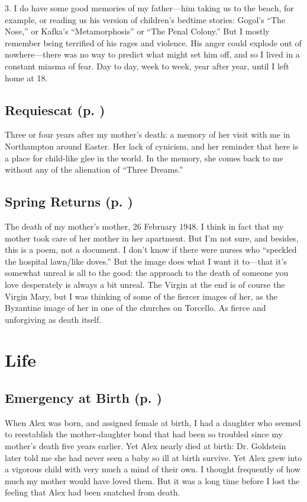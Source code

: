 3. I do have some good memories of my father---him taking us to the beach, for
example, or reading us his version of children's bedtime stories: Gogol's ``The
Nose,'' or Kafka's ``Metamorphosis'' or ``The Penal Colony.'' But I mostly
remember being terrified of his rages and violence. His anger could explode out
of nowhere---there was no way to predict what might set him off, and so I lived
in a constant miasma of fear. Day to day, week to week, year after year, until I
left home at 18.

\subsection{Requiescat (p. \pageref{ch:requiescat})}
Three or four years after my mother's death: a memory of her visit with me in
Northampton around Easter. Her lack of cynicism, and her reminder that here is a
place for child-like glee in the world. In the memory, she comes back to me
without any of the alienation of ``Three Dreams.''

\subsection{Spring Returns (p. \pageref{ch:springreturns})}
The death of my mother's mother, 26 February 1948. I think in fact that my
mother took care of her mother in her apartment. But I'm not sure, and besides,
this is a poem, not a document. I don't know if there were nurses who ``speckled
the hospital lawn/like doves.'' But the image does what I want it to---that it's
somewhat unreal is all to the good: the approach to the death of someone you
love desperately is always a bit unreal. The Virgin at the end is of course the
Virgin Mary, but I was thinking of some of the fiercer images of her, as the
Byzantine image of her in one of the churches on Torcello. As fierce and
unforgiving as death itself.

\section*{Life}

\subsection{Emergency at Birth (p. \pageref{ch:emergency})}
When Alex was born, and assigned female at birth, I had a daughter who seemed to
reestablish the mother-daughter bond that had been so troubled since my mother's
death five years earlier. Yet Alex nearly died at birth: Dr. Goldstein later
told me she had never seen a baby so ill at birth survive. Yet Alex grew into a
vigorous child with very much a mind of their own. I thought frequently of how
much my mother would have loved them. But it was a long time before I lost the
feeling that Alex had been snatched from death.

